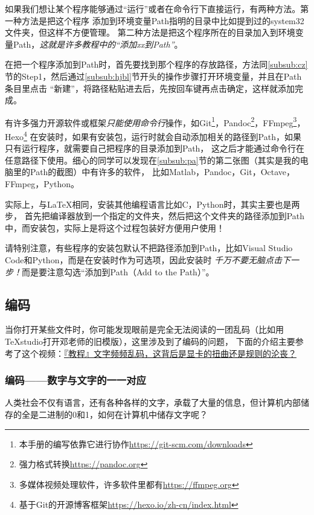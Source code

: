 如果我们想让某个程序能够通过“运行”或者在命令行下直接运行，有两种方法。第一种方法是把这个程序
添加到环境变量Path指明的目录中比如提到过的system32文件夹，但这样不方便管理。
第二种方法是把这个程序所在的目录加入到环境变量Path，\emph{这就是许多教程中的“添加xx到Path”}。

在把一个程序添加到Path时，首先要找到那个程序的存放路径，方法同\ref{subsub:cz}节的Step1，然后通过\ref{subsub:hjbl}节开头的操作步骤打开环境变量，并且在Path条目里点击
“新建”，将路径粘贴进去后，先按回车键再点击确定，这样就添加完成。

有许多强力开源软件或框架\emph{只能使用命令行}操作，如Git\footnote{本手册的编写依靠它进行协作\url{https://git-scm.com/downloads}}，Pandoc\footnote{强力格式转换\url{https://pandoc.org}}，FFmpeg\footnote{多媒体视频处理软件，许多软件里都有\url{https://ffmpeg.org}}，
Hexo\footnote{基于Git的开源博客框架\url{https://hexo.io/zh-cn/index.html}}
在安装时，如果有安装包，运行时就会自动添加相关的路径到Path，如果只有运行程序，就需要自己把程序的目录添加到Path，
这之后才能通过命令行在任意路径下使用。细心的同学可以发现在\ref{subsub:pa}节的第二张图（其实是我的电脑里的Path的截图）中有许多的软件，
比如Matlab，Pandoc，Git，Octave，FFmpeg，Python。

实际上，与\LaTeX{}相同，安装其他编程语言比如C，Python时，其实主要也是两步，
首先把编译器放到一个指定的文件夹，然后把这个文件夹的路径添加到Path中，而安装包，实际上是将这个过程包装好方便用户使用！

请特别注意，有些程序的安装包默认不把路径添加到Path，比如Visual Studio Code和Python，而是在安装时作为可选项，因此安装时
\emph{千万不要无脑点击下一步！}而是要注意勾选“添加到Path（Add to the Path）”。


\subsection{编码}


当你打开某些文件时，你可能发现眼前是完全无法阅读的一团乱码（比如用TeXstudio打开邓老师的旧模版），这里涉及到了编码的问题，
下面的介绍主要参考了这个视频：\href{https://www.bilibili.com/video/BV1ai4y1x7Uz?spm_id_from=333.999.0.0}{『教程』文字频频乱码，这背后是显卡的扭曲还是规则的沦丧？}



\subsubsection{编码——数字与文字的一一对应}


人类社会不仅有语言，还有各种各样的文字，承载了大量的信息，但计算机内部储存的全是二进制的0和1，如何在计算机中储存文字呢？


